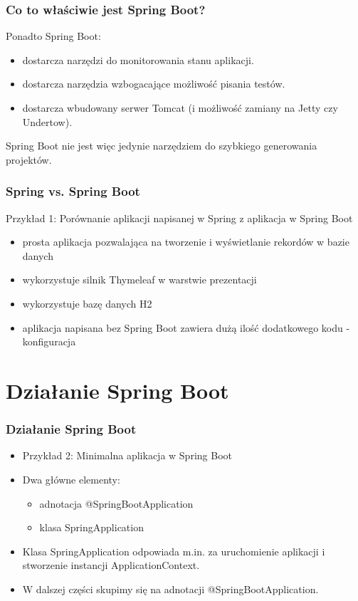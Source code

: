 \documentclass{beamer}
\begin{document}
\begin{frame}
\frametitle{Co to właściwie jest Spring Boot?}
Ponadto Spring Boot:
\begin{itemize}
\item dostarcza narzędzi do monitorowania stanu aplikacji.
\item dostarcza narzędzia wzbogacające możliwość pisania testów.
\item dostarcza wbudowany serwer Tomcat (i możliwość zamiany na Jetty czy Undertow).
\end{itemize}
Spring Boot nie jest więc jedynie narzędziem do szybkiego generowania projektów.
\end{frame}

\begin{frame}
\frametitle{Spring vs. Spring Boot}
Przykład 1: Porównanie aplikacji napisanej w Spring z aplikacja w Spring Boot
\begin{itemize}
\item prosta aplikacja pozwalająca na tworzenie i wyświetlanie rekordów w bazie danych
\item wykorzystuje silnik Thymeleaf w warstwie prezentacji
\item wykorzystuje bazę danych H2
\item aplikacja napisana bez Spring Boot zawiera dużą ilość dodatkowego kodu - konfiguracja
\end{itemize}
\end{frame}

\section{Działanie Spring Boot}


\begin{frame}
\frametitle{Działanie Spring Boot}
\begin{itemize}
\item Przykład 2: Minimalna aplikacja w Spring Boot
\item Dwa główne elementy:
\begin{itemize}
    \item adnotacja @SpringBootApplication
    \item klasa SpringApplication
\end{itemize}
\item Klasa SpringApplication odpowiada m.in. za uruchomienie aplikacji i stworzenie instancji ApplicationContext.
\item W dalszej części skupimy się na adnotacji @SpringBootApplication.
\end{itemize}
\end{frame}
\end{document}
